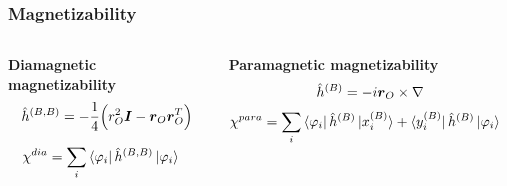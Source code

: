 \begin{frame}
\frametitle{Magnetizability}
\begin{columns}

\begin{column}[b]{0.5\textwidth}
\centering
\textbf{Diamagnetic magnetizability}
\begin{equation}
    \nonumber
    \hat{h}^{(B,B)} = 
    -\frac{1}{4}\Big(r_O^2\boldsymbol{I} 
    -\boldsymbol{r}_O\boldsymbol{r}_O^T\Big)
\end{equation}

\vspace{2mm}

\begin{align}
    \nonumber
    \chi^{dia} &= \sum_i \bra{\varphi_i} \hat{h}^{(B,B)} \ket{\varphi_i}
\end{align}
\end{column}

\begin{column}[b]{0.5\textwidth}
\centering
\textbf{Paramagnetic magnetizability}
\begin{equation}
    \nonumber
    \hat{h}^{(B)} = -i \boldsymbol{r}_O\times\nabla
\end{equation}
\vspace{2mm}
\begin{align}
    \nonumber
    \chi^{para} &= \sum_i 
    \bra{\varphi_i}\hat{h}^{(B)} \ket{x_i^{(B)}} + 
    \bra{y_i^{(B)}}\hat{h}^{(B)}\ket{\varphi_i}
\end{align}
\end{column}

\end{columns}
\vspace{6mm}


\end{frame}
